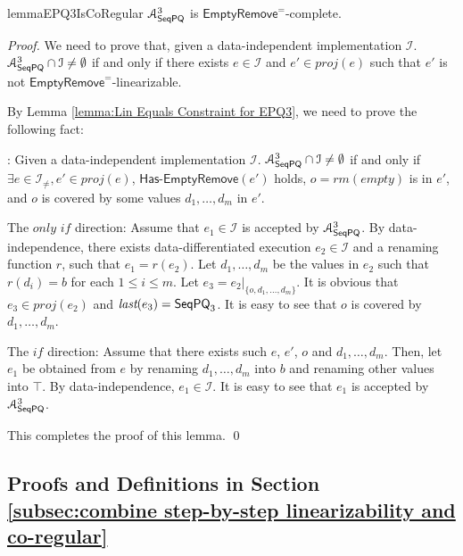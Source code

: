 \begin{restatable}{lemma}{EPQ3IsCoRegular}
\label{lemma:EPQ3 is co-regular}
$\mathcal{A}_{\mathsf{SeqPQ}}^3$ is $\mathsf{EmptyRemove}^{=}$-complete.
\end{restatable}

\begin {proof}

We need to prove that, given a data-independent implementation $\mathcal{I}$. $\mathcal{A}_{\mathsf{SeqPQ}}^3 \cap \mathcal{I} \neq \emptyset$ if and only if there exists $e \in \mathcal{I}$ and $e' \in \textit{proj}(e)$ such that $e'$ is not $\mathsf{EmptyRemove}^{=}$-linearizable.

By Lemma \ref{lemma:Lin Equals Constraint for EPQ3}, we need to prove the following fact:

: Given a data-independent implementation $\mathcal{I}$. $\mathcal{A}_{\mathsf{SeqPQ}}^3 \cap \mathcal{I} \neq \emptyset$ if and only if $\exists e \in \mathcal{I}_{\neq},e' \in \textit{proj}(e)$, $\mathsf{Has\text{-}EmptyRemove}(e')$ holds, $o = \textit{rm}(\textit{empty})$ is in $e'$, and $o$ is covered by some values $d_1,\ldots,d_m$ in $e'$.


\noindent The $\textit{only if}$ direction: Assume that $e_1 \in \mathcal{I}$ is accepted by $\mathcal{A}_{\mathsf{SeqPQ}}^3$. By data-independence, there exists data-differentiated execution $e_2 \in \mathcal{I}$ and a renaming function $r$, such that $e_1=r(e_2)$. Let $d_1,\ldots,d_m$ be the values in $e_2$ such that $r(d_i)=b$ for each $1 \leq i \leq m$. Let $e_3 = e_2 \vert_{ \{ o, d_1, \ldots, d_m \} }$. It is obvious that $e_3 \in \textit{proj}(e_2)$ and $\textit{last}(e_3) = \mathsf{SeqPQ}_3$. It is easy to see that $o$ is covered by $d_1,\ldots,d_m$.

\noindent The $\textit{if}$ direction: Assume that there exists such $e$, $e'$, $o$ and $d_1,\ldots,d_m$. Then, let $e_1$ be obtained from $e$ by renaming $d_1,\ldots,d_m$ into $b$ and renaming other values into $\top$. By data-independence, $e_1 \in \mathcal{I}$. It is easy to see that $e_1$ is accepted by $\mathcal{A}_{\mathsf{SeqPQ}}^3$.

This completes the proof of this lemma. \qed
\end {proof}



\subsection{Proofs and Definitions in Section \ref{subsec:combine step-by-step linearizability and co-regular}}
\label{subsec:appendix proof and definition in subsection decidability result}

